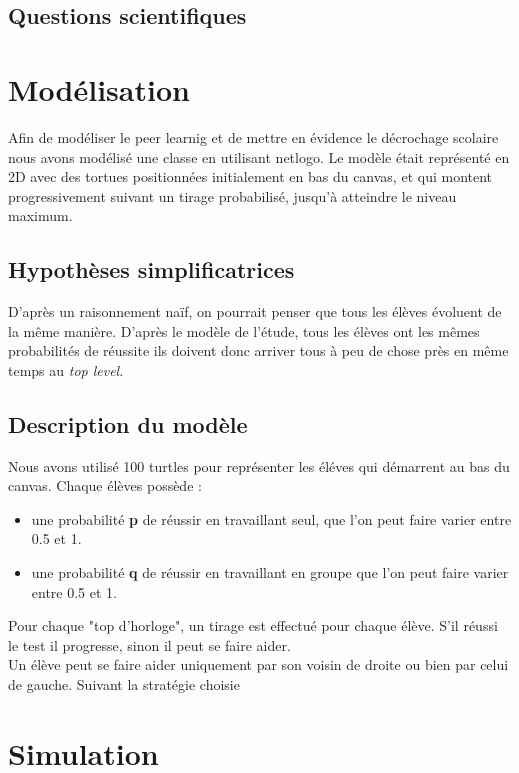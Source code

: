 \documentclass{article}
\begin{document}
\subsection{Questions scientifiques}



 

\section{Modélisation}

Afin de modéliser le peer learnig et de mettre en évidence le décrochage scolaire nous avons modélisé une classe en utilisant netlogo. Le modèle était représenté en 2D avec des tortues positionnées initialement en bas du canvas, et qui montent progressivement suivant un tirage probabilisé, jusqu'à atteindre le niveau maximum.  


\subsection{Hypothèses simplificatrices}
D'après un raisonnement naïf, on pourrait penser que tous les élèves évoluent de la même manière. D'après le modèle de l'étude, tous les élèves ont les mêmes probabilités de réussite ils doivent donc arriver tous à peu de chose près en même temps au {\it top level}.


\subsection{Description du modèle}

Nous avons utilisé 100 turtles pour représenter les éléves qui démarrent au bas du canvas. Chaque élèves possède :
\begin{itemize}
\item une probabilité {\bf p} de réussir en travaillant seul, que l'on peut faire varier entre 0.5 et 1. 
\item une probabilité {\bf q} de réussir en travaillant en groupe que l'on peut faire varier entre 0.5 et 1. 
\end{itemize}
Pour chaque "top d'horloge", un tirage est effectué pour chaque élève. S'il réussi le test il progresse, sinon il peut se faire aider.\\
Un élève peut se faire aider uniquement par son voisin de droite ou bien par celui de gauche. Suivant la stratégie choisie 

\section{Simulation}
\end{document}
